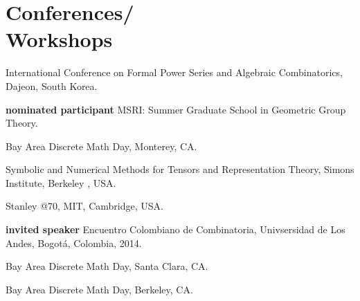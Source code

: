 \section{\sc Conferences/ \\ Workshops }
\begin{list1}
\item[2015] International Conference on Formal Power Series and Algebraic Combinatorics, Dajeon, South Korea. 
\item[2015] {\bf nominated participant} MSRI: Summer Graduate School in Geometric Group Theory. 
\item[2015] Bay Area Discrete Math Day, Monterey, CA. 
\item[2014] Symbolic and Numerical Methods for Tensors and Representation Theory, Simons Institute, Berkeley , USA.
\item[2014]  Stanley @70, MIT, Cambridge, USA.
\item[2014] {\bf invited speaker} Encuentro Colombiano de Combinatoria, Univsersidad de Los Andes, Bogot\'a, Colombia, 2014.
\item[2014] Bay Area Discrete Math Day, Santa Clara, CA.
\item[2013]  Bay Area Discrete Math Day, Berkeley, CA.
\end{list1}


